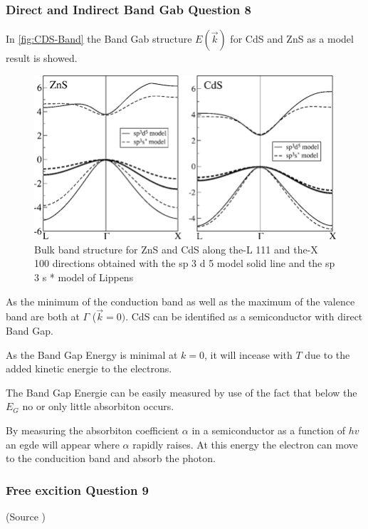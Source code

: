 \subsubsection*{Direct and Indirect Band Gab Question 8}

In \autoref{fig:CDS-Band} the Band Gab structure $E(\vec{k})$ for CdS and ZnS as 
a model result is showed.

\begin{figure}[H]
  \centering
  \includegraphics[width=0.7\linewidth]{Graphics/Chapter3/Bulk-band-structure-for-ZnS-and-CdS-along-the-L-111-and-the-X-100-directions-obtained.png}
  \caption{Bulk band structure for ZnS and CdS along the-L 111 and the-X 100 directions obtained with the sp 3 d 5 
  model solid line and the sp 3 s * model of Lippens \cite{band_gap_CdS}}
  \label{fig:CDS-Band}
\end{figure}

As the minimum of the conduction band as well as the maximum of the valence band are both 
at $\Gamma$ ($\vec{k}= 0)$. CdS can be identified as a semiconductor with
direct Band Gap.

As the Band Gap Energy is minimal at $k=0$, it will incease 
with $T$ due to the added kinetic energie to the electrons.

The Band Gap Energie can be easily measured by use of the fact
that below the $E_G$ no or only little absorbiton occurs.

By measuring the absorbiton coefficient $\alpha$ in a 
semiconductor as a function of $hv$ an egde will appear 
where $\alpha$ rapidly raises. At this energy the electron
can move to the conducition band and absorb the photon.


\subsubsection*{Free excition Question 9}

(Source \cite[Introduction to Solid State Physics p. 312]{kittel})

